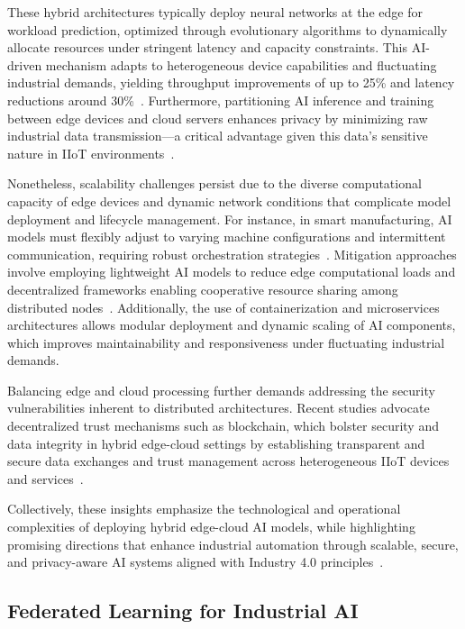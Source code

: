 \documentclass[sigconf]{acmart}
\begin{document}
These hybrid architectures typically deploy neural networks at the edge for workload prediction, optimized through evolutionary algorithms to dynamically allocate resources under stringent latency and capacity constraints. This AI-driven mechanism adapts to heterogeneous device capabilities and fluctuating industrial demands, yielding throughput improvements of up to 25\% and latency reductions around 30\%~\cite{ref31}. Furthermore, partitioning AI inference and training between edge devices and cloud servers enhances privacy by minimizing raw industrial data transmission—a critical advantage given this data's sensitive nature in IIoT environments~\cite{ref22}.

Nonetheless, scalability challenges persist due to the diverse computational capacity of edge devices and dynamic network conditions that complicate model deployment and lifecycle management. For instance, in smart manufacturing, AI models must flexibly adjust to varying machine configurations and intermittent communication, requiring robust orchestration strategies~\cite{ref33}. Mitigation approaches involve employing lightweight AI models to reduce edge computational loads and decentralized frameworks enabling cooperative resource sharing among distributed nodes~\cite{ref31,ref33}. Additionally, the use of containerization and microservices architectures allows modular deployment and dynamic scaling of AI components, which improves maintainability and responsiveness under fluctuating industrial demands.

Balancing edge and cloud processing further demands addressing the security vulnerabilities inherent to distributed architectures. Recent studies advocate decentralized trust mechanisms such as blockchain, which bolster security and data integrity in hybrid edge-cloud settings by establishing transparent and secure data exchanges and trust management across heterogeneous IIoT devices and services~\cite{ref31}.

Collectively, these insights emphasize the technological and operational complexities of deploying hybrid edge-cloud AI models, while highlighting promising directions that enhance industrial automation through scalable, secure, and privacy-aware AI systems aligned with Industry 4.0 principles~\cite{ref33}.

\subsection{Federated Learning for Industrial AI}
\end{document}
